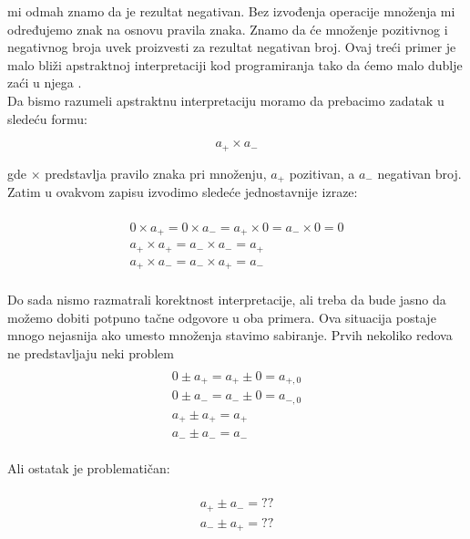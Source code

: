 mi odmah znamo da je rezultat negativan. Bez izvođenja operacije množenja mi određujemo znak na osnovu pravila znaka. Znamo da će množenje pozitivnog i negativnog broja uvek proizvesti za rezultat negativan broj. Ovaj treći primer je malo bliži apstraktnoj interpretaciji kod programiranja tako da ćemo malo dublje zaći u njega \cite{AbramskyHankin}. \\

Da bismo razumeli apstraktnu interpretaciju moramo da prebacimo zadatak u sledeću formu:

\begin{equation}
  a_{+} \times a_{-}
\end{equation}

gde $\times$ predstavlja pravilo znaka pri množenju, $a_{+}$ pozitivan, a $a_{-}$ negativan broj. Zatim u ovakvom zapisu izvodimo sledeće jednostavnije izraze:

\begin{multline} \\
  	0 \times a_{+} = 0 \times a_{-} = a_{+} \times 0 = a_{-} \times 0 = 0 \\
  	a_{+} \times a_{+} = a_{-} \times a_{-} = a_{+} \\
  	a_{+} \times a_{-} = a_{-} \times a_{+} = a_{-} \\
\end{multline}

Do sada nismo razmatrali korektnost interpretacije, ali treba da bude jasno da možemo dobiti potpuno tačne odgovore u oba primera. Ova situacija postaje mnogo nejasnija ako umesto množenja stavimo sabiranje. Prvih nekoliko redova ne pred\-stavljaju neki problem \\

\begin{multline} \\
	0 \pm a_{+} = a_{+} \pm 0 = a_{+,0} \\ 
	0 \pm a_{-} = a_{-} \pm 0 = a_{-,0} \\ 
	a_{+} \pm a_{+} = a_{+}  \\ 
	a_{-} \pm a_{-} = a_{-}  \\ 
\end{multline}


Ali ostatak je problematičan:

\begin{multline}	\\
	a_{+} \pm a_{-} = ?? \\ 
	a_{-} \pm a_{+} = ?? \\ 
\end{multline}

